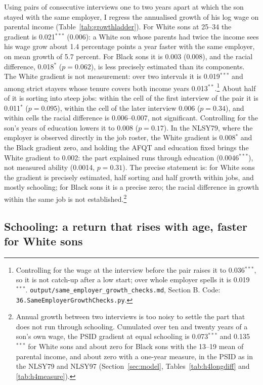 Using pairs of consecutive interviews one to two years apart at which the son stayed with the same employer, I regress
the annualised growth of his log wage on parental income (Table~\ref{tab:growthladder}). For White sons at 25--34 the
gradient is 0.021$^{***}$ (0.006): a White son whose parents had twice the income sees his wage grow about 1.4 percentage
points a year faster with the same employer, on mean growth of 5.7 percent. For Black sons it is 0.003 (0.008), and the
racial difference, 0.018$^{*}$ ($p=0.062$), is less precisely estimated than its components. The White gradient is not
measurement: over two intervals it is 0.019$^{***}$ and among strict stayers whose tenure covers both income years
0.013$^{**}$.\footnote{Controlling for the wage at the interview before the pair raises it to 0.036$^{***}$, so it is not
catch-up after a low start; over whole employer spells it is 0.019$^{***}$. \texttt{output/same\_employer\_growth\_checks.md},
Section B. Code: \texttt{36.SameEmployerGrowthChecks.py}.} About half of it is sorting into steep jobs: within the
cell of the first interview of the pair it is 0.011$^{*}$ ($p=0.095$), within the cell of the later interview 0.006
($p=0.34$), and within cells the racial difference is 0.006--0.007, not significant. Controlling for the son's years of
education lowers it to 0.008 ($p=0.17$). In the NLSY79, where the employer is observed directly in the job roster, the
White gradient is 0.008$^{*}$ and the Black gradient zero, and holding the AFQT and education fixed brings the White
gradient to 0.002: the part explained runs through education (0.0046$^{***}$), not measured ability (0.0014, $p=0.31$).
The precise statement is: for White sons the gradient is precisely estimated, half sorting and half growth within jobs,
and mostly schooling; for Black sons it is a precise zero; the racial difference in growth within the same job is not
established.\footnote{Annual growth between two interviews is too noisy to settle the part that does not run through
schooling. Cumulated over ten and twenty years of a son's own wage, the PSID gradient at equal schooling is
0.073$^{***}$ and 0.135$^{***}$ for White sons and about zero for Black sons with the 13--19 mean of parental income,
and about zero with a one-year measure, in the PSID as in the NLSY79 and NLSY97 (Section~\ref{sec:model},
Tables~\ref{tab:h4longdiff} and \ref{tab:h4measure}).}



\subsection{Schooling: a return that rises with age, faster for White sons}\label{sec:schooling}


